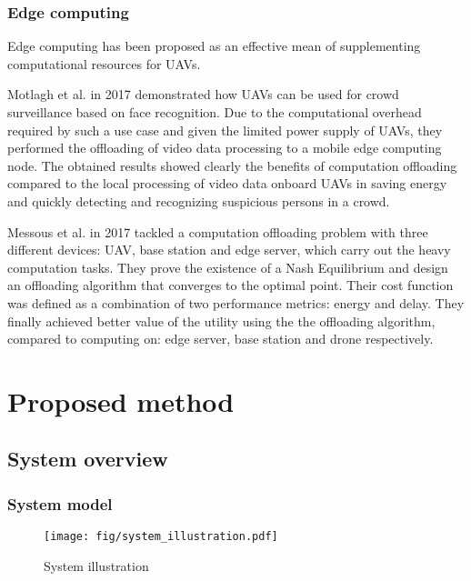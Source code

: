 \documentclass{ieeeaccess}
\begin{document}
\subsubsection{Edge computing}
Edge computing has been proposed as an effective mean of supplementing computational resources for UAVs\cite{Motlagh2017,Messous2017}.

Motlagh et al. in 2017 demonstrated how UAVs can be used for crowd surveillance based on face recognition. 
Due to the computational overhead required by such a use case and given the limited power supply of UAVs, they performed the offloading of video data processing to a mobile edge computing node.
The obtained results showed clearly the benefits of computation offloading compared to the local processing of video data onboard UAVs in saving energy and quickly detecting and recognizing suspicious persons in a crowd.

Messous et al. in 2017 tackled a computation offloading problem with three different devices: UAV, base station and edge server, which carry out the heavy computation tasks.
They prove the existence of a Nash Equilibrium and design an offloading algorithm that converges to the optimal point.
Their cost function was defined as a combination of two performance metrics: energy and delay.
They finally achieved better value of the utility using the the offloading algorithm, compared to computing on: edge server, base station and drone respectively.
%
%


\section{Proposed method}\label{method}

\subsection{System overview}\label{sys}
\subsubsection{System model}\label{sysmo}

\begin{figure}[htbp]
\begin{center}
\texttt{[image: fig/system\_illustration.pdf]}
\caption{System illustration}
\label{model}
\end{center}
\end{figure}
\end{document}
